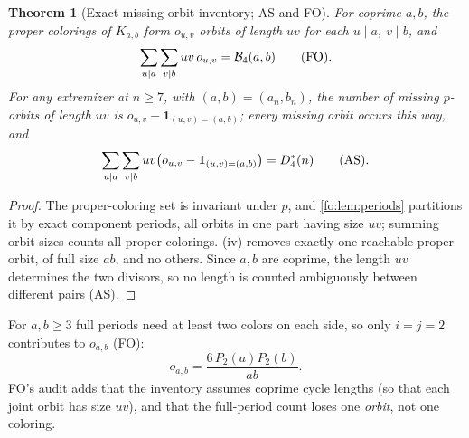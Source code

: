 \documentclass[11pt,a4paper]{article}
\numberwithin{equation}{section}
\newtheorem{theorem}{Theorem}[section]
\theoremstyle{definition}
\theoremstyle{remark}
\newcommand{\Bip}{\mathcal B}
\newcommand{\bbone}{\mathbf 1}
\begin{document}
\begin{theorem}[Exact missing-orbit inventory; AS and FO]\label{fo:thm:inventory}
For coprime $a,b$, the proper colorings of $K_{a,b}$ form $o_{u,v}$ orbits of
length $uv$ for each $u\mid a$, $v\mid b$, and
\begin{equation}\label{fo:eq:inventorysum}
 \sum_{u\mid a}\sum_{v\mid b}uv\,o_{u,v}=\Bip_4(a,b)\qquad\textup{(FO)}.
\end{equation}
For any extremizer at $n\ge7$, with $(a,b)=(a_n,b_n)$, the number of missing
$p$-orbits of length $uv$ is $o_{u,v}-\bbone_{(u,v)=(a,b)}$; every missing
orbit occurs this way, and
\begin{equation}\label{fo:eq:inventoryD}
 \sum_{u\mid a}\sum_{v\mid b}uv\bigl(o_{u,v}-\bbone_{(u,v)=(a,b)}\bigr)=D^*_4(n)
 \qquad\textup{(AS)}.
\end{equation}
\end{theorem}

\begin{proof}
The proper-coloring set is invariant under $p$, and \cref{fo:lem:periods}
partitions it by exact component periods, all orbits in one part having size
$uv$; summing orbit sizes counts all proper colorings. (iv)
removes exactly one reachable proper orbit, of full size $ab$, and no others.
Since $a,b$ are coprime, the length $uv$ determines the two divisors, so no
length is counted ambiguously between different pairs (AS).
\end{proof}

For $a,b\ge3$ full periods need at least two colors on each side, so only
$i=j=2$ contributes to $o_{a,b}$ (FO):
\begin{equation}\label{fo:fo:eq:fullinventory}
 o_{a,b}=\frac{6\,P_2(a)P_2(b)}{ab}.
\end{equation}
FO's audit adds that the inventory assumes coprime cycle lengths (so that
each joint orbit has size $uv$), and that the full-period count loses one
\emph{orbit}, not one coloring.
\end{document}

